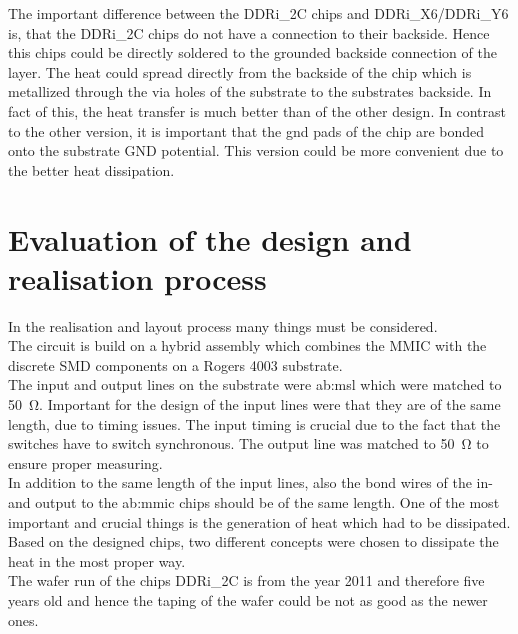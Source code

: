 The important difference between the DDRi\_2C chips and DDRi\_X6/DDRi\_Y6 is, that the DDRi\_2C chips do not have a connection to their backside.
Hence this chips could be directly soldered to the grounded backside connection of the layer.
The heat could spread directly from the backside of the chip which is metallized through the via holes of the substrate to the substrates backside.
In fact of this, the heat transfer is much better than of the other design.
In contrast to the other version, it is important that the gnd pads of the chip are bonded onto the substrate GND potential. 
This version could be more convenient due to the better heat dissipation.\\

\section{Evaluation of the design and realisation process}
In the realisation and layout process many things must be considered.\\
The circuit is build on a hybrid assembly which combines the MMIC with the discrete SMD components on a Rogers 4003 substrate.\\
The input and output lines on the substrate were \gls{ab:msl} which were matched to \SI{50}{\ohm}.
Important for the design of the input lines were that they are of the same length, due to timing issues.
The input timing is crucial due to the fact that the switches have to switch synchronous.
The output line was matched to \SI{50}{\ohm} to ensure proper measuring.\\
In addition to the same length of the input lines, also the bond wires of the in- and output to the \gls{ab:mmic} chips should be of the same length.
One of the most important and crucial things is the generation of heat which had to be dissipated.
Based on the designed chips, two different concepts were chosen to dissipate the heat in the most proper way.\\
The wafer run of the chips DDRi\_2C is from the year 2011 and therefore five years old and hence the taping of the wafer could be not as good as the newer ones.
